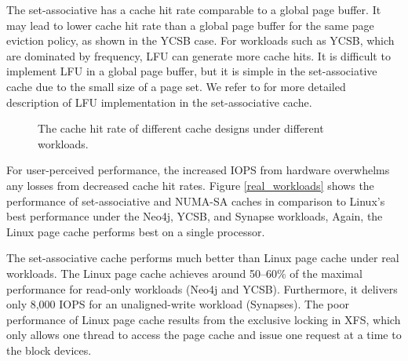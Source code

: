 The set-associative has a cache hit rate comparable to a global page buffer.
It may lead to lower cache hit rate than a global page
buffer for the same page eviction policy, as shown in the YCSB case.
For workloads such as YCSB, which are 
dominated by frequency, LFU can generate more cache hits. It is difficult
to implement LFU in a global page buffer, but it is simple in the set-associative cache
due to the small size of a page set. We refer to \cite{hotstorage12} for
more detailed description of LFU implementation in the set-associative cache.

\begin{figure}[tb]
\begin{center}
\vspace{-15pt}

\vspace{-15pt}
\caption{The cache hit rate of different cache designs under different workloads.}
\label{cache_hits}
\end{center}
\end{figure}


For user-perceived performance, the increased IOPS  from hardware overwhelms any 
losses from decreased cache hit rates.   Figure \ref{real_workloads} shows 
the performance of set-associative and NUMA-SA caches in comparison to Linux's best 
performance under the Neo4j, YCSB, and Synapse workloads,
Again, the Linux page cache performs best on a single processor.

The set-associative cache performs much better than Linux page cache under real workloads.
The Linux page cache achieves around 50--60\% of the maximal performance
for read-only workloads (Neo4j and YCSB).  Furthermore,  it 
delivers only 8,000 IOPS for an unaligned-write workload (Synapses). 
The poor performance of Linux page cache results from the exclusive locking in XFS, 
which only allows one thread to access the page cache and issue one request at a time to
the block devices. 

